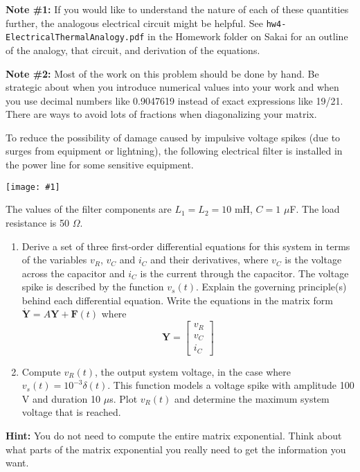 \documentclass[12pt,letterpaper]{hmcpset}
\newcommand{\diagram}[2]{\begin{center}\texttt{[image: \#1]}\end{center}}
\begin{document}
	
	\begin{problem}[2 (cont.)]
		\setlength{\parskip}{3pt}
		\textbf{Note \#1:} If you would like to understand the nature of each of these quantities further, the
		analogous electrical circuit might be helpful. See \texttt{hw4-ElectricalThermalAnalogy.pdf} in
		the Homework folder on Sakai for an outline of the analogy, that circuit, and derivation of the
		equations.
		
		\textbf{Note \#2:} Most of the work on this problem should be done by hand. Be strategic about
		when you introduce numerical values into your work and when you use decimal numbers like 0.9047619 instead of exact expressions like 19/21. There are ways to avoid lots of fractions
		when diagonalizing your matrix.
	\end{problem}
	
	\begin{solution}
		\vfill
	\end{solution}
	
	\afterpage{\null\newpage}
	\newpage
	
	
	
	\begin{problem}[3]
		To reduce the possibility of damage caused by impulsive voltage spikes (due to surges from
		equipment or lightning), the following electrical filter is installed in the power line for some
		sensitive equipment.
		
		\diagram{Circuit}{3}
		
		The values of the filter components are $L_1 = L_2 = 10$ mH, $C = 1$ $\mu$F. The load resistance is 50 $\Omega$.
		\begin{enumerate}
			\item Derive a set of three first-order differential equations for this system in terms of the
			variables $v_R$, $v_C$ and $i_C$ and their derivatives, where $v_C$ is the voltage across the capacitor
			and $i_C$ is the current through the capacitor. The voltage spike is described by the
			function $v_s (t)$. Explain the governing principle(s) behind each differential equation.
			Write the equations in the matrix form $\Dot{\textbf{Y}} = A\textbf{Y} + \textbf{F}(t)$ where
			$$ \textbf{Y} = \begin{bmatrix}
			v_R\\
			v_C\\
			i_C
			\end{bmatrix} $$
			
			\item Compute $v_R (t)$, the output system voltage, in the case where $v_s (t) = 10^{−3} \delta(t)$. This
			function models a voltage spike with amplitude 100 V and duration 10 $\mu$s. Plot $v_R (t)$ and determine the maximum system voltage that is reached.
		\end{enumerate}
		
		\textbf{Hint:} You do not need to compute the entire matrix exponential. Think about what
		parts of the matrix exponential you really need to get the information you want.
	\end{problem}

	
	\begin{solution}
		\vfill
	\end{solution}
\end{document}
